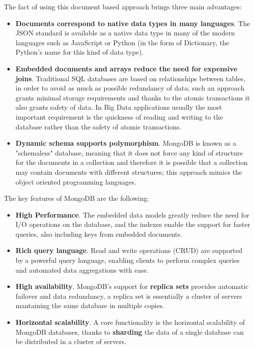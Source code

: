 \documentclass[11pt,a4paper,titlepage]{book}
\begin{document}
The fact of using this document based approach brings three main advantages:
\begin{itemize}
    \item \textbf{Documents correspond to native data types in many languages}. The JSON standard is available as a native data type in many of the modern languages such as JavaScript or Python (in the form of Dictionary, the Python's name for this kind of data type).
    \item \textbf{Embedded documents and arrays reduce the need for expensive joins}. Traditional SQL databases are based on relationships between tables, in order to avoid as much as possible redundancy of data; such an approach grants minimal storage requirements and thanks to the atomic transactions it also grants safety of data. In Big Data applications usually the most important requirement is the quickness of reading and writing to the database rather than the safety of atomic transactions.
    \item \textbf{Dynamic schema supports polymorphism}. MongoDB is known as a "schemaless" database, meaning that it does not force any kind of structure for the documents in a collection and therefore it is possible that a collection may contain documents with different structures; this approach mimics the object oriented programming languages.
\end{itemize}
The key features of MongoDB are the following:
\begin{itemize}
    \item \textbf{High Performance}. The embedded data models greatly reduce the need for I/O operations on the database, and the indexes enable the support for faster queries, also including keys from embedded documents. 
    \item \textbf{Rich query language}. Read and write operations (CRUD) are supported by a powerful query language, enabling clients to perform complex queries and automated data aggregations with ease.
    \item \textbf{High availability}. MongoDB's support for \textbf{replica sets} provides automatic failover and data redundancy, a replica set is essentially a cluster of servers mantaining the same database in multiple copies.
    \item \textbf{Horizontal scalability}. A core functionality is the horizontal scalability of MongoDB databases, thanks to \textbf{sharding} the data of a single database can be distributed in a cluster of servers.
\end{itemize}
\end{document}
